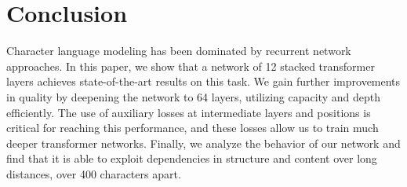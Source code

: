 \section{Conclusion}
Character language modeling has been dominated by recurrent network approaches. In this paper, we show that a network of 12 stacked transformer layers achieves state-of-the-art results on this task. We gain further improvements in quality by deepening the network to 64 layers, utilizing capacity and depth efficiently. The use of auxiliary losses at intermediate layers and positions is critical for reaching this performance, and these losses allow us to train much deeper transformer networks. Finally, we analyze the behavior of our network and find that it is able to exploit dependencies in structure and content over long distances, over 400 characters apart.

\fontsize{9.5pt}{10.5pt} \selectfont 


